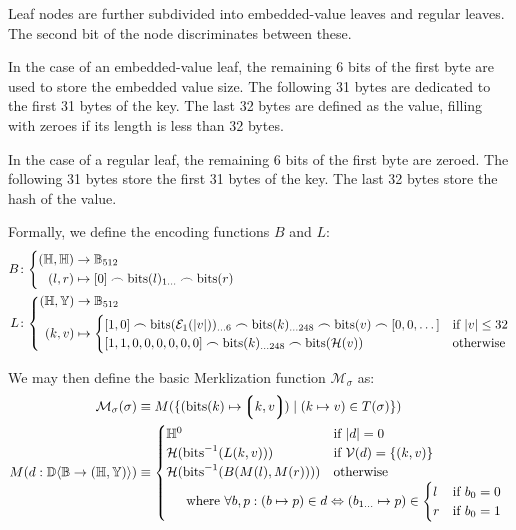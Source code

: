 Leaf nodes are further subdivided into embedded-value leaves and regular leaves. The second bit of the node discriminates between these.

In the case of an embedded-value leaf, the remaining 6 bits of the first byte are used to store the embedded value size. The following 31 bytes are dedicated to the first 31 bytes of the key. The last 32 bytes are defined as the value, filling with zeroes if its length is less than 32 bytes.

In the case of a regular leaf, the remaining 6 bits of the first byte are zeroed. The following 31 bytes store the first 31 bytes of the key. The last 32 bytes store the hash of the value.

Formally, we define the encoding functions $B$ and $L$:
\begin{align}
  B&\colon\left\{\begin{aligned}
    (\H, \H) &\to \mathbb{B}_{512}\\
    (l, r) &\mapsto [0] \frown \text{bits}(l)_{1\dots} \frown \text{bits}(r)
  \end{aligned}\right.\\
  L&\colon\left\{\begin{aligned}
    (\H, \Y) &\to \mathbb{B}_{512}\\
    (k, v) &\mapsto \begin{cases}
      [1, 0] \frown \text{bits}(\se_1(|v|))_{\dots6} \frown \text{bits}(k)_{\dots248} \frown \text{bits}(v) \frown [0, 0, \dots] &\when |v| \le 32\\
      [1, 1, 0, 0, 0, 0, 0, 0] \frown \text{bits}(k)_{\dots248} \frown \text{bits}(\mathcal{H}(v)) &\otherwise
    \end{cases}
  \end{aligned}\right.
\end{align}

We may then define the basic Merklization function $\mathcal{M}_\sigma$ as:
\begin{align}
  \mathcal{M}_\sigma(\sigma) &\equiv M(\{ (\text{bits}(k) \mapsto \tup{k, v}) \mid (k \mapsto v) \in T(\sigma) \})\\
  M(d: \dict{\mathbb{B}}{(\H, \Y)}) &\equiv \begin{cases}
    \H^0 &\when |d| = 0\\
    \mathcal{H}(\text{bits}^{-1}(L(k, v))) &\when \mathcal{V}(d) = \{ (k, v) \}\\
    \mathcal{H}(\text{bits}^{-1}(B(M(l), M(r)))) &\otherwise\\
    \multicolumn{2}{l}{\quad\where \forall b, p: (b \mapsto p) \in d \Leftrightarrow (b_{1\dots} \mapsto p) \in \begin{cases}
      l &\when b_0 = 0 \\
      r &\when b_0 = 1
    \end{cases}
  }\end{cases}
\end{align}

